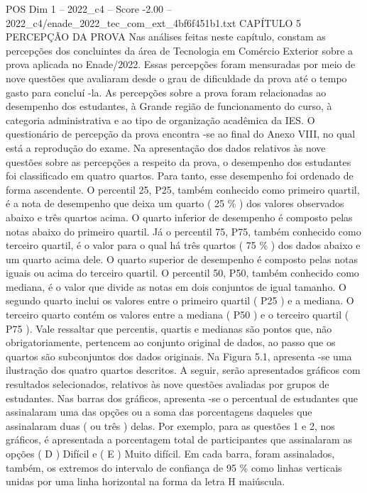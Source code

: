 \begin{textsample}{POS Dim 1 – 2022\_c4 – Score -2.00 – 2022\_c4/enade\_2022\_tec\_com\_ext\_4bf6f451b1.txt}  \label{ex:f1_pos_252}
CAPÍTULO 5 PERCEPÇÃO DA PROVA Nas análises feitas neste capítulo, constam as percepções dos concluintes da área de Tecnologia em Comércio Exterior sobre a prova aplicada no Enade/2022.
Essas percepções foram mensuradas por meio de nove questões que avaliaram desde o grau de dificuldade da prova até o tempo gasto para concluí -la.
As percepções sobre a prova foram relacionadas ao desempenho dos estudantes, à Grande região de funcionamento do curso, à categoria administrativa e ao tipo de organização acadêmica da IES.
O questionário de percepção da prova encontra -se ao final do Anexo VIII, no qual está a reprodução do exame.
Na apresentação dos dados relativos às nove questões sobre as percepções a respeito da prova, o desempenho dos estudantes foi classificado em quatro quartos.
Para tanto, esse desempenho foi ordenado de forma ascendente.
O percentil 25, P25, também conhecido como primeiro quartil, é a nota de desempenho que deixa um quarto ( 25 \% ) dos valores observados abaixo e três quartos acima.
O quarto inferior de desempenho é composto pelas notas abaixo do primeiro quartil.
Já o percentil 75, P75, também conhecido como terceiro quartil, é o valor para o qual há três quartos ( 75 \% ) dos dados abaixo e um quarto acima dele.
O quarto superior de desempenho é composto pelas notas iguais ou acima do terceiro quartil.
O percentil 50, P50, também conhecido como mediana, é o valor que divide as notas em dois conjuntos de igual tamanho.
O segundo quarto inclui os valores entre o primeiro quartil ( P25 ) e a mediana.
O terceiro quarto contém os valores entre a mediana ( P50 ) e o terceiro quartil ( P75 ).
Vale ressaltar que percentis, quartis e medianas são pontos que, não obrigatoriamente, pertencem ao conjunto original de dados, ao passo que os quartos são subconjuntos dos dados originais.
Na Figura 5.1, apresenta -se uma ilustração dos quatro quartos descritos.
A seguir, serão apresentados gráficos com resultados selecionados, relativos às nove questões avaliadas por grupos de estudantes.
Nas barras dos gráficos, apresenta -se o percentual de estudantes que assinalaram uma das opções ou a soma das porcentagens daqueles que assinalaram duas ( ou três ) delas.
Por exemplo, para as questões 1 e 2, nos gráficos, é apresentada a porcentagem total de participantes que assinalaram as opções ( D ) Difícil e ( E ) Muito difícil.
Em cada barra, foram assinalados, também, os extremos do intervalo de confiança de 95 \% como linhas verticais unidas por uma linha horizontal na forma da letra H maiúscula.

\end{textsample}
